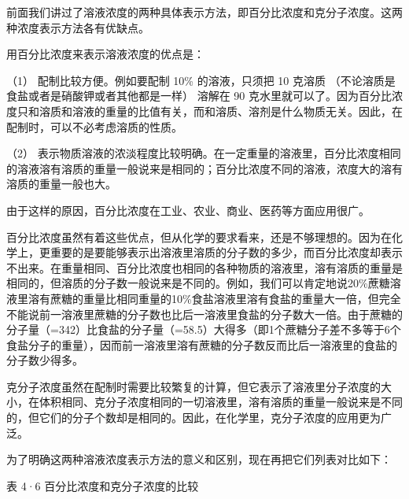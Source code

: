 前面我们讲过了溶液浓度的两种具体表示方法，即百分比浓度和克分子浓度。这两种浓度表示方法各有优缺点。

用百分比浓度来表示溶液浓度的优点是：

（1） 配制比较方便。例如要配制 10\% 的溶液，只须把 10 克溶质
（不论溶质是食盐或者是硝酸钾或者其他都是一样） 溶解在 90
克水里就可以了。因为百分比浓度只和溶质和溶液的重量的比值有关，而和溶质、溶剂是什么物质无关。因此，在配制时，可以不必考虑溶质的性质。

（2）
表示物质溶液的浓淡程度比较明确。在一定重量的溶液里，百分比浓度相同的溶液溶有溶质的重量一般说来是相同的；百分比浓度不同的溶液，浓度大的溶有溶质的重量一般也大。

由于这样的原因，百分比浓度在工业、农业、商业、医药等方面应用很广。

百分比浓度虽然有着这些优点，但从化学的要求看来，还是不够理想的。因为在化学上，更重要的是要能够表示出溶液里溶质的分子数的多少，而百分比浓度却表示不出来。在重量相同、百分比浓度也相同的各种物质的溶液里，溶有溶质的重量是相同的，但溶质的分子数一般说来是不同的。例如，我们可以肯定地说20\%蔗糖溶液里溶有蔗糖的重量比相同重量的10\%食盐溶液里溶有食盐的重量大一倍，但完全不能说前一溶液里蔗糖的分子数也比后一溶液里食盐的分子数大一倍。由于蔗糖的分子量（=342）比食盐的分子量（=58.5）大得多（即1个蔗糖分子差不多等于6个食盐分子的重量），因而前一溶液里溶有蔗糖的分子数反而比后一溶液里的食盐的分子数少得多。

克分子浓度虽然在配制时需要比较繁复的计算，但它表示了溶液里分子浓度的大小，在体积相同、克分子浓度相同的一切溶液里，溶有溶质的重量一般说来是不同的，但它们的分子个数却是相同的。因此，在化学里，克分子浓度的应用更为广泛。

为了明确这两种溶液浓度表示方法的意义和区别，现在再把它们列表对比如下：

表 4·6 百分比浓度和克分子浓度的比较

